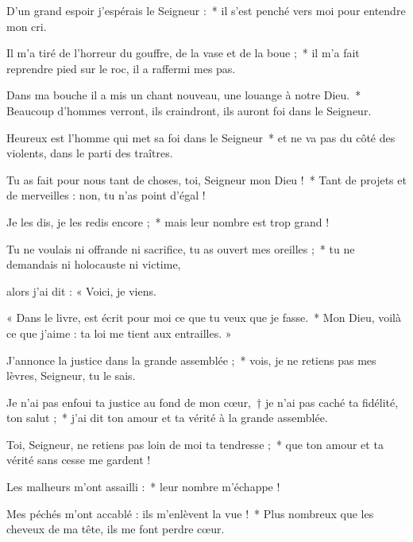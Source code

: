 \item D'un grand espoir j'espérais le Seigneur :~* il s'est penché vers moi pour entendre mon cri.

\item Il m'a tiré de l'horreur du gouffre, de la vase et de la boue ;~* il m'a fait reprendre pied sur le roc, il a raffermi mes pas.

\item Dans ma bouche il a mis un chant nouveau, une louange à notre Dieu.~* Beaucoup d'hommes verront, ils craindront, ils auront foi dans le Seigneur.

\item Heureux est l'homme qui met sa foi dans le Seigneur~* et ne va pas du côté des violents, dans le parti des traîtres.

\item Tu as fait pour nous tant de choses, toi, Seigneur mon Dieu !~* Tant de projets et de merveilles : non, tu n'as point d'égal ! 

\item Je les dis, je les redis encore ;~* mais leur nombre est trop grand !

\item Tu ne voulais ni offrande ni sacrifice, tu as ouvert mes oreilles ;~* tu ne demandais ni holocauste ni victime,

\item alors j'ai dit : « Voici, je viens.

\item « Dans le livre, est écrit pour moi ce que tu veux que je fasse.~* Mon Dieu, voilà ce que j'aime : ta loi me tient aux entrailles. »

\item J'annonce la justice dans la grande assemblée ;~* vois, je ne retiens pas mes lèvres, Seigneur, tu le sais.

\item Je n'ai pas enfoui ta justice au fond de mon cœur,~† je n'ai pas caché ta fidélité, ton salut ;~* j'ai dit ton amour et ta vérité à la grande assemblée.

\item Toi, Seigneur, ne retiens pas loin de moi ta tendresse ;~* que ton amour et ta vérité sans cesse me gardent !

\item Les malheurs m'ont assailli :~* leur nombre m'échappe ! 

\item Mes péchés m'ont accablé : ils m'enlèvent la vue !~* Plus nombreux que les cheveux de ma tête, ils me font perdre cœur.

